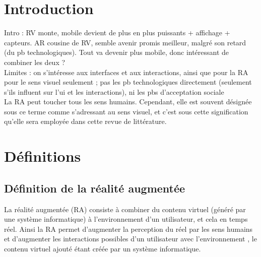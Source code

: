 \section*{Introduction}
Intro : RV monte, mobile devient de plus en plus puissants + affichage + capteurs. AR cousine de RV, semble avenir promis meilleur, malgré son retard (du pb technologiques). Tout va devenir plus mobile, donc intéressant de combiner les deux ?
\cite{DeSaChurchill2013} \\
Limites : on s'intéresse aux interfaces et aux interactions, ainsi que pour la RA pour le sens visuel seulement ; pas les pb technologiques directement (seulement s'ils influent sur l'ui et les interactions), ni les pbs d'acceptation sociale \\

La RA peut toucher tous les sens humains. Cependant, elle est souvent désignée sous ce terme comme s'adressant au sens visuel, et c'est sous cette signification qu'elle sera employée dans cette revue de littérature.


\section*{Définitions}
\subsection*{Définition de la réalité augmentée}
La réalité augmentée (RA) consiste à combiner du contenu virtuel (généré par une système informatique) à l'environnement d'un utilisateur, et cela en temps réel. Ainsi la RA permet d'augmenter la perception du réel par les sens humains et d'augmenter les interactions possibles d'un utilisateur avec l'environnement \citep{Azuma1997}, le contenu virtuel ajouté étant créée par un système informatique.

